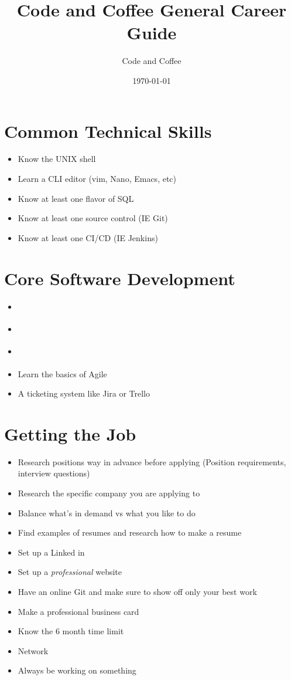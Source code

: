 \documentclass[12pt]{article}
\title{Code and Coffee General Career Guide}
\author{Code and Coffee}
\date{\today}
\begin{document}
\maketitle

\section{Common Technical Skills}
\begin{itemize}
\item Know the UNIX shell
\item Learn a CLI editor (vim, Nano, Emacs, etc)
\item Know at least one flavor of SQL
\item Know at least one source control (IE Git)
\item Know at least one CI/CD (IE Jenkins)
\end{itemize}

\section{Core Software Development}
\begin{itemize}
\item \autocite{mcdowell2015interview}
\item \autocite{skiena2008algorithm}
\item \autocite{gamma1994patterns}
\item Learn the basics of Agile
\item A ticketing system like Jira or Trello
\end{itemize}


\section{Getting the Job}
\begin{itemize}
\item Research positions way in advance before applying (Position requirements, interview questions)
\item Research the specific company you are applying to
\item Balance what's in demand vs what you like to do
\item Find examples of resumes and research how to make a resume
\item Set up a Linked in
\item Set up a \textit{professional} website
\item Have an online Git and make sure to show off only your best work
\item Make a professional business card
\item Know the 6 month time limit
\item Network
\item Always be working on something
\end{itemize}
\end{document}
